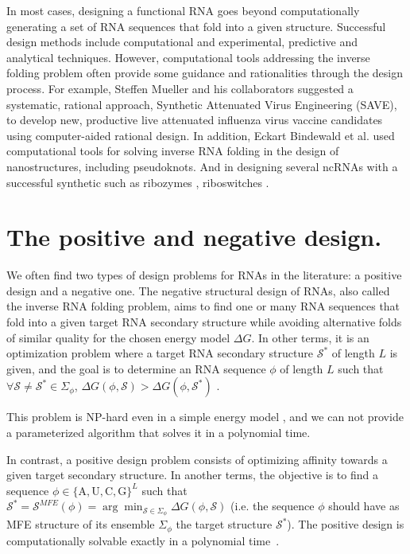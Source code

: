 In most cases, designing a functional RNA goes beyond computationally generating a set of RNA sequences that fold into a given structure. Successful design methods include computational and experimental, predictive and analytical techniques. However, computational tools addressing the inverse folding problem often provide some guidance and rationalities through the design process. For example, Steffen Mueller and his collaborators \cite{mueller2010live} suggested a systematic, rational approach, Synthetic Attenuated Virus Engineering (SAVE), to develop new, productive live attenuated influenza virus vaccine candidates using computer-aided rational design. In addition, Eckart Bindewald et al. \cite{bindewald2011multistrand} used computational tools for solving inverse RNA folding in the design of nanostructures, including pseudoknots. And in designing several ncRNAs with a successful synthetic such as ribozymes \cite{dotu2014complete}, riboswitches \cite{findeiss2015design,wachsmuth2015design}. 

\section{The positive and negative design.}
We often find two types of design problems for RNAs in the literature: a positive design and a negative one. The negative structural design of RNAs, also called the inverse RNA folding problem, aims to find one or many RNA sequences that fold into a given target RNA secondary structure while avoiding alternative folds of similar quality for
the chosen energy model $\Delta G$. In other terms, it is an optimization problem where a target RNA secondary structure $\mathcal{S}^*$ of length $L$ is given, and the goal is to determine an RNA sequence $\phi$ of length $L$ such that $\forall \mathcal{S} \neq \mathcal{S}^* \in \Sigma_{\phi}$, $\Delta G(\phi, \mathcal{S}) > \Delta G(\phi, \mathcal{S}^*)$ .

This problem is NP-hard even in a simple energy model \cite{bonnet2020designing}, and we can not provide a parameterized algorithm that solves it in a polynomial time. 

In contrast, a positive design problem consists of optimizing affinity towards a given target secondary structure. In another terms, the objective is to find a sequence $\phi \in \{\text{A},\text{U},\text{C},\text{G}\}^L$ such that  $ \mathcal{S}^*=\mathcal{S}^{MFE}(\phi) = \arg \min_{\mathcal{S} \in \Sigma_{\phi}} \Delta G(\phi, \mathcal{S})$ (i.e. the sequence $\phi$ should have as MFE structure of its ensemble $\Sigma_{\phi}$ the target structure $\mathcal{S}^*$). The positive design is computationally solvable exactly in a polynomial time \cite{flamm2001design}. 

